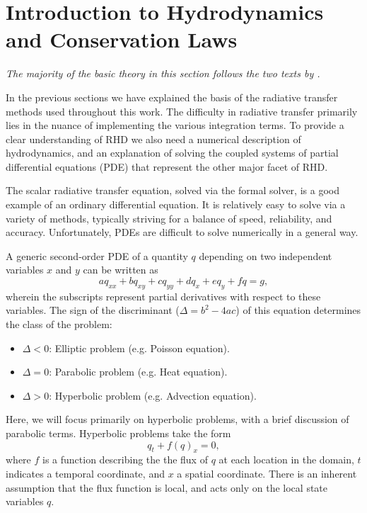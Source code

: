 \section{Introduction to Hydrodynamics and Conservation Laws}\label{Sec:IntroConsLaws}
\emph{The majority of the basic theory in this section follows the two texts by \citet{LeVeque1997,LeVeque2002}.}

In the previous sections we have explained the basis of the radiative transfer methods used throughout this work.
The difficulty in radiative transfer primarily lies in the nuance of implementing the various integration terms.
To provide a clear understanding of RHD we also need a numerical description of hydrodynamics, and an explanation of solving the coupled systems of partial differential equations (PDE) that represent the other major facet of RHD.

The scalar radiative transfer equation, solved via the formal solver, is a good example of an ordinary differential equation.
It is relatively easy to solve via a variety of methods, typically striving for a balance of speed, reliability, and accuracy.
Unfortunately, PDEs are difficult to solve numerically in a general way.

A generic second-order PDE of a quantity $q$ depending on two independent variables $x$ and $y$ can be written as
\begin{equation}
    aq_{xx} + bq_{xy} + cq_{yy} + dq_x + eq_y + fq = g,
\end{equation}
wherein the subscripts represent partial derivatives with respect to these variables.
The sign of the discriminant ($\Delta = b^2-4ac$) of this equation determines the class of the problem:
\begin{itemize}
    \item $\Delta < 0$: Elliptic problem (e.g. Poisson equation).
    \item $\Delta = 0$: Parabolic problem (e.g. Heat equation).
    \item $\Delta > 0$: Hyperbolic problem (e.g. Advection equation).
\end{itemize}
Here, we will focus primarily on hyperbolic problems, with a brief discussion of parabolic terms.
Hyperbolic problems take the form
\begin{equation}\label{Eq:ConsLaw}
    q_t + f(q)_x = 0,
\end{equation}
where $f$ is a function describing the the flux of $q$ at each location in the domain, $t$ indicates a temporal coordinate, and $x$ a spatial coordinate.
There is an inherent assumption that the flux function is local, and acts only on the local state variables $q$.

